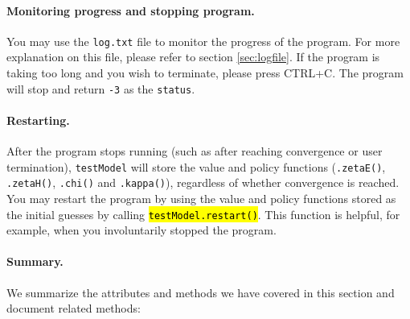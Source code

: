 \documentclass[12pt]{article}
\DeclareRobustCommand{\hlCODE}[1]{{\sethlcolor{backcolour}\hl{#1}}}
\begin{document}
\paragraph{Monitoring progress and stopping program.} You may use the \texttt{log.txt} file to monitor the progress of the program. For more explanation on this file, please refer to section \ref{sec:logfile}. If the program is taking too long and you wish to terminate, please press CTRL+C. The program will stop and return \texttt{-3} as the \texttt{status}.

\paragraph{Restarting. } After the program stops running (such as after reaching convergence or user termination), \texttt{testModel} will store the value and policy functions (\texttt{.zetaE()}, \texttt{.zetaH()}, \texttt{.chi()} and \texttt{.kappa()}), regardless of whether convergence is reached. You may restart the program by using the value and policy functions stored as the initial guesses by calling \hlCODE{\texttt{testModel.restart()}}. This function is helpful, for example, when you involuntarily stopped the program.

\paragraph{Summary.} We summarize the attributes and methods we have covered in this section and document related methods:
\end{document}
